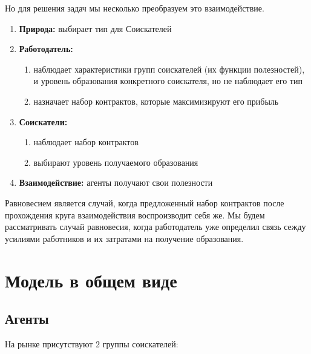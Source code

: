 \indent\setlength{\parindent}{1em}Но для решения задач мы несколько преобразуем это взаимодействие.

\begin{enumerate}
    \item \textbf{Природа:} выбирает тип для Соискателей
    \item \textbf{Работодатель:} \begin{enumerate}
        \item наблюдает характеристики групп соискателей (их функции полезностей), и уровень образования конкретного соискателя, но не наблюдает его тип
        \item назначает набор контрактов, которые максимизируют его прибыль
    \end{enumerate}
    \item \textbf{Соискатели:} \begin{enumerate}
        \item наблюдает набор контрактов
        \item выбирают уровень получаемого образования
    \end{enumerate}
    \item \textbf{Взаимодействие:} агенты получают свои полезности
\end{enumerate}

\indent\setlength{\parindent}{1em}Равновесием является случай, когда предложенный набор контрактов после прохождения
круга взаимодействия воспроизводит себя же. Мы будем рассматривать случай равновесия, когда работодатель уже
определил связь сежду усилиями работников и их затратами на получение образования.


\section{Модель в общем виде}

\subsection{Агенты}

\indent\setlength{\parindent}{1em}На рынке присутствуют 2 группы соискателей:

